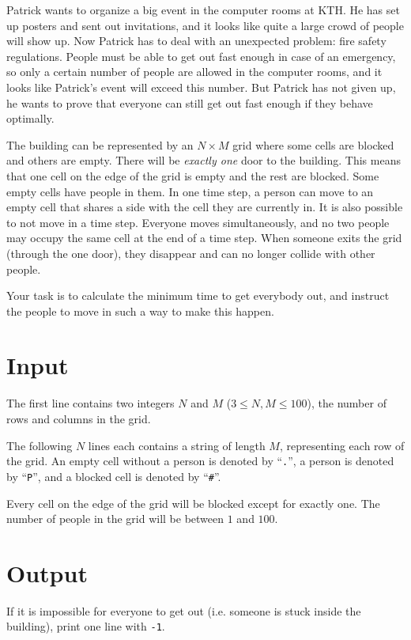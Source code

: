 

Patrick wants to organize a big event in the computer rooms at KTH. He has set up posters and sent 
out invitations, and it looks like quite a large crowd of people will show up. Now Patrick has to
deal with an unexpected problem: fire safety regulations. People must be able to get out fast enough
in case of an emergency, so only a certain number of people are allowed in the computer rooms, and
it looks like Patrick's event will exceed this number. But Patrick has not given up, he wants to prove
that everyone can still get out fast enough if they behave optimally.

The building can be represented by an $N \times M$ grid where some cells are blocked and others 
are empty. There will be \textit{exactly one} door to the building. This means that one cell on the
edge of the grid is empty and the rest are blocked. Some empty cells have people in them. In one 
time step, a person can move to an empty cell that shares a side with the cell they are currently
in. It is also possible to not move in a time step. Everyone moves simultaneously, and no two
 people may occupy the same cell at the end of a time step. When someone exits the grid (through
 the one door), they disappear and can no longer collide with other people.

 Your task is to calculate the minimum time to get everybody out, and instruct the people to move
 in such a way to make this happen.


\section*{Input}
The first line contains two integers $N$ and $M$ ($3 \leq N, M \leq 100$), the number of rows
and columns in the grid.

The following $N$ lines each contains a string of length $M$, representing each row of the grid.
An empty cell without a person is denoted by ``\texttt{.}'', a person is denoted by ``\texttt{P}'', and a blocked
cell is denoted by ``\texttt{\#}''.

Every cell on the edge of the grid will be blocked except for exactly one. The number of people in
the grid will be between $1$ and $100$.

\section*{Output}
If it is impossible for everyone to get out (i.e. someone is stuck inside the building), print
one line with \texttt{-1}.

